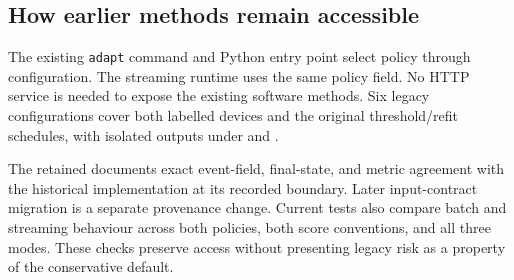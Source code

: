 \subsection{How earlier methods remain accessible}

The existing \texttt{adapt} command and Python
 entry point select policy through configuration.
The streaming runtime uses the same policy field. No HTTP service is needed
to expose the existing software methods. Six legacy configurations cover both
labelled devices and the original threshold/refit schedules, with isolated
outputs under  and
.

The retained 
documents exact event-field, final-state, and metric agreement with the
historical implementation at its recorded boundary. Later input-contract
migration is a separate provenance change. Current tests also compare batch
and streaming behaviour across both policies, both score conventions, and all
three modes. These checks preserve access without presenting legacy risk as a
property of the conservative default.
